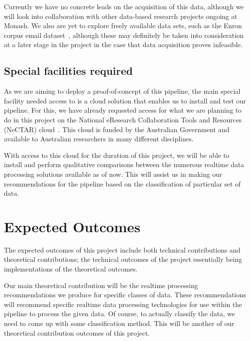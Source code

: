 \documentclass[a4paper,11pt]{article}
\begin{document}
Currently we have no concrete leads on the acquisition of this data, although we will look into collaboration with other
data-based research projects ongoing at Monash. We also are yet to explore freely available data sets, such as the Enron
corpus email dataset~\cite{klimt2004introducing}, although these may definitely be taken into
consideration at a later stage in the project in the case that data acquisition proves infeasible.


\subsection{Special facilities required} %
\label{sub:special_facilities_required}

As we are aiming to deploy a proof-of-concept of this pipeline, the main special
facility needed access to is a cloud solution that enables us to install and
test our pipeline. For this, we have already requested access for what we are
planning to do in this project on the National eResearch Collaboration Tools and
Resources (NeCTAR) cloud~\cite{web:Nectar}. This cloud is funded by the
Australian Government and available to Australian researchers in many different
disciplines.

With access to this cloud for the duration of this project, we will be able to
install and perform qualitative comparisons between the numerous realtime data
processing solutions available as of now. This will assist us in making our
recommendations for the pipeline based on the classification of particular set
of data.





\section{Expected Outcomes} %
\label{sec:expected_outcomes}

The expected outcomes of this project include both technical contributions and
theoretical contributions; the technical outcomes of the project essentially
being implementations of the theoretical outcomes.

Our main theoretical contribution will be the realtime processing
recommendations we produce for specific classes of data. These recommendations
will recommend specific realtime data processing technologies for use within the
pipeline to process the given data. Of course, to actually classify the data, we
need to come up with some classification method. This will be another of our
theoretical contribution outcomes of this project.
\end{document}
